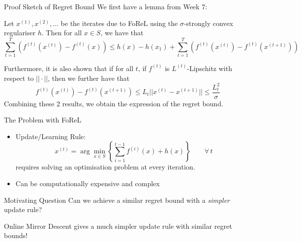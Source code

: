 \documentclass{beamer}
\begin{document}
\begin{frame}{Proof Sketch of Regret Bound}
We first have a lemma from Week 7: \begin{lemma}\label{lemma:iterates_forel}
    Let $x^{(1)}, x^{(2)}, \ldots$ be the iterates due to FoReL using the $\sigma$-strongly convex regulariser $h$. Then for all $x \in S$, we have that \begin{equation}\label{eqn:lemma_forel}
        \sum_{t=1}^T (f^{(t)}(x^{(t)}) - f^{(t)}(x)) \leq h(x) - h(x_1) + \sum_{t=1}^T (f^{(t)}(x^{(t)}) - f^{(t)}(x^{(t+1)}))
    \end{equation}
\end{lemma}\pause
Furthermore, it is also shown that if for all $t$, if $f^{(t)}$ is $L^{(t)}$-Lipschitz with respect to $||\cdot||$, then we further have that 
\begin{equation}\label{eqn:lemma_forel_lipschitz}
    f^{(t)}(x^{(t)}) - f^{(t)}(x^{(t+1)}) \leq L_t ||x^{(t)} - x^{(t+1)}|| \leq \frac{L_t^2}{\sigma}
\end{equation} \pause
    Combining these 2 results, we obtain the expression of the regret bound.
\end{frame}

\begin{frame}{The Problem with FoReL}
    \begin{itemize}
        \item Update/Learning Rule: $$x^{(t)} = \arg \min_{x \in S} \left\{\sum_{i = 1}^{t-1} f^{(i)}(x) + h(x)\right\}\qquad\forall\,t$$ requires solving an optimisation problem at every iteration.
        \item Can be computationally expensive and complex
    \end{itemize}\pause
    \begin{block}{Motivating Question}
    Can we achieve a similar regret bound with a \textit{simpler} update rule?
    \end{block}
    \pause
    Online Mirror Descent gives a much simpler update rule with similar regret bounds!
\end{frame}


\end{document}
